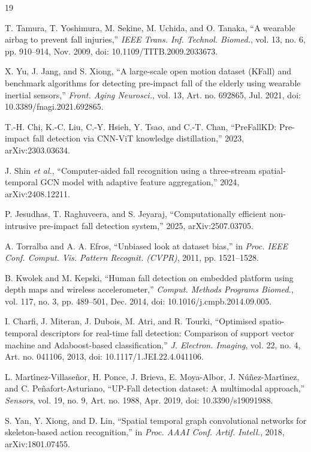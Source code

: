 \documentclass[journal]{IEEEtran}
\begin{document}
\begin{thebibliography}{19}

 T. Tamura, T. Yoshimura, M. Sekine, M. Uchida, and O. Tanaka, ``A wearable airbag to prevent fall injuries,'' \textit{IEEE Trans. Inf. Technol. Biomed.}, vol. 13, no. 6, pp. 910--914, Nov. 2009, doi: 10.1109/TITB.2009.2033673.

 X. Yu, J. Jang, and S. Xiong, ``A large-scale open motion dataset (KFall) and benchmark algorithms for detecting pre-impact fall of the elderly using wearable inertial sensors,'' \textit{Front. Aging Neurosci.}, vol. 13, Art. no. 692865, Jul. 2021, doi: 10.3389/fnagi.2021.692865.

 T.-H. Chi, K.-C. Liu, C.-Y. Hsieh, Y. Tsao, and C.-T. Chan, ``PreFallKD: Pre-impact fall detection via CNN-ViT knowledge distillation,'' 2023, arXiv:2303.03634.

 J. Shin \textit{et al.}, ``Computer-aided fall recognition using a three-stream spatial-temporal GCN model with adaptive feature aggregation,'' 2024, arXiv:2408.12211.

 P. Jesudhas, T. Raghuveera, and S. Jeyaraj, ``Computationally efficient non-intrusive pre-impact fall detection system,'' 2025, arXiv:2507.03705.

 A. Torralba and A. A. Efros, ``Unbiased look at dataset bias,'' in \textit{Proc. IEEE Conf. Comput. Vis. Pattern Recognit. (CVPR)}, 2011, pp. 1521--1528.

 B. Kwolek and M. Kepski, ``Human fall detection on embedded platform using depth maps and wireless accelerometer,'' \textit{Comput. Methods Programs Biomed.}, vol. 117, no. 3, pp. 489--501, Dec. 2014, doi: 10.1016/j.cmpb.2014.09.005.

 I. Charfi, J. Miteran, J. Dubois, M. Atri, and R. Tourki, ``Optimised spatio-temporal descriptors for real-time fall detection: Comparison of support vector machine and Adaboost-based classification,'' \textit{J. Electron. Imaging}, vol. 22, no. 4, Art. no. 041106, 2013, doi: 10.1117/1.JEI.22.4.041106.

 L. Mart\'{\i}nez-Villase\~nor, H. Ponce, J. Brieva, E. Moya-Albor, J. N\'u\~nez-Mart\'{\i}nez, and C. Pe\~nafort-Asturiano, ``UP-Fall detection dataset: A multimodal approach,'' \textit{Sensors}, vol. 19, no. 9, Art. no. 1988, Apr. 2019, doi: 10.3390/s19091988.

 S. Yan, Y. Xiong, and D. Lin, ``Spatial temporal graph convolutional networks for skeleton-based action recognition,'' in \textit{Proc. AAAI Conf. Artif. Intell.}, 2018, arXiv:1801.07455.


\end{thebibliography}
\end{document}
